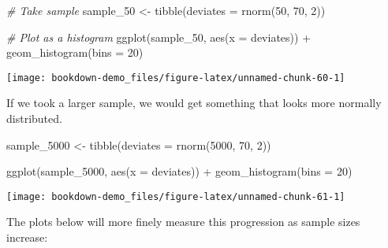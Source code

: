 \documentclass[
]{book}
\newenvironment{Shaded}{\begin{snugshade}}{\end{snugshade}}
\newcommand{\AttributeTok}[1]{\textcolor[rgb]{0.77,0.63,0.00}{#1}}
\newcommand{\CommentTok}[1]{\textcolor[rgb]{0.56,0.35,0.01}{\textit{#1}}}
\newcommand{\DecValTok}[1]{\textcolor[rgb]{0.00,0.00,0.81}{#1}}
\newcommand{\FunctionTok}[1]{\textcolor[rgb]{0.00,0.00,0.00}{#1}}
\newcommand{\NormalTok}[1]{#1}
\newcommand{\OtherTok}[1]{\textcolor[rgb]{0.56,0.35,0.01}{#1}}
\newcommand{\SpecialCharTok}[1]{\textcolor[rgb]{0.00,0.00,0.00}{#1}}
\begin{document}
\begin{Shaded}
\begin{Highlighting}[]
\CommentTok{\# Take sample}
\NormalTok{sample\_50 }\OtherTok{\textless{}{-}} \FunctionTok{tibble}\NormalTok{(}\AttributeTok{deviates =} \FunctionTok{rnorm}\NormalTok{(}\DecValTok{50}\NormalTok{, }\DecValTok{70}\NormalTok{, }\DecValTok{2}\NormalTok{))}

\CommentTok{\# Plot as a histogram}
\FunctionTok{ggplot}\NormalTok{(sample\_50, }\FunctionTok{aes}\NormalTok{(}\AttributeTok{x =}\NormalTok{ deviates)) }\SpecialCharTok{+}
  \FunctionTok{geom\_histogram}\NormalTok{(}\AttributeTok{bins =} \DecValTok{20}\NormalTok{)}
\end{Highlighting}
\end{Shaded}

\begin{center}\texttt{[image: bookdown-demo\_files/figure-latex/unnamed-chunk-60-1]} \end{center}

If we took a larger sample, we would get something that looks more normally distributed.

\begin{Shaded}
\begin{Highlighting}[]
\NormalTok{sample\_5000 }\OtherTok{\textless{}{-}} \FunctionTok{tibble}\NormalTok{(}\AttributeTok{deviates =} \FunctionTok{rnorm}\NormalTok{(}\DecValTok{5000}\NormalTok{, }\DecValTok{70}\NormalTok{, }\DecValTok{2}\NormalTok{))}

\FunctionTok{ggplot}\NormalTok{(sample\_5000, }\FunctionTok{aes}\NormalTok{(}\AttributeTok{x =}\NormalTok{ deviates)) }\SpecialCharTok{+}
  \FunctionTok{geom\_histogram}\NormalTok{(}\AttributeTok{bins =} \DecValTok{20}\NormalTok{)}
\end{Highlighting}
\end{Shaded}

\begin{center}\texttt{[image: bookdown-demo\_files/figure-latex/unnamed-chunk-61-1]} \end{center}

The plots below will more finely measure this progression as sample sizes increase:
\end{document}
